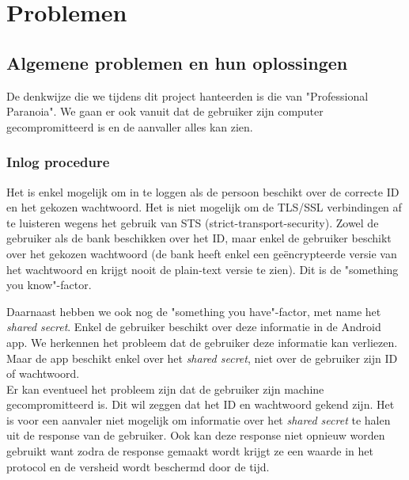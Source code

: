 \documentclass[11pt]{article}
\begin{document}
\section{Problemen}
\subsection{Algemene problemen en hun oplossingen}
De denkwijze die we tijdens dit project hanteerden is die van "Professional Paranoia". We gaan er ook vanuit dat de gebruiker zijn computer gecompromitteerd is en de aanvaller alles kan zien.

\subsubsection{Inlog procedure}
Het is enkel mogelijk om in te loggen als de persoon beschikt over de correcte ID en het gekozen wachtwoord. Het is niet mogelijk om de TLS/SSL verbindingen af te luisteren wegens het gebruik van STS (strict-transport-security). Zowel de gebruiker als de bank beschikken over het ID, maar enkel de gebruiker beschikt over het gekozen wachtwoord (de bank heeft enkel een ge\"encrypteerde versie van het wachtwoord en krijgt nooit de plain-text versie te zien). Dit is de "something you know"-factor.

Daarnaast hebben we ook nog de "something you have"-factor, met name het \emph{shared secret}. Enkel de gebruiker beschikt over deze informatie in de Android app. We herkennen het probleem dat de gebruiker deze informatie kan verliezen. Maar de app beschikt enkel over het \emph{shared secret}, niet over de gebruiker zijn ID of wachtwoord.\\

Er kan eventueel het probleem zijn dat de gebruiker zijn machine gecompromitteerd is. Dit wil zeggen dat het ID en wachtwoord gekend zijn. Het is voor een aanvaler niet mogelijk om informatie over het \emph{shared secret} te halen uit de response van de gebruiker. Ook kan deze response niet opnieuw worden gebruikt want zodra de response gemaakt wordt krijgt ze een waarde in het protocol en de versheid wordt beschermd door de tijd.
\end{document}
